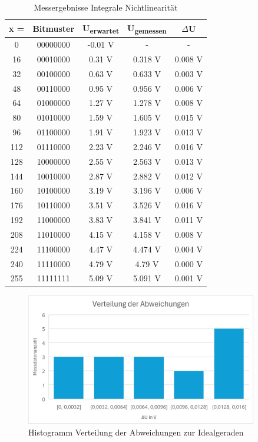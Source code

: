 \documentclass[a4paper,12pt]{article}
\begin{document}
\begin{table}[H]
    \centering
    \begin{tabular}{|c|c|c|c|c|}
        \hline
        x = & Bitmuster & U\textsubscript{erwartet} & U\textsubscript{gemessen} & $\Delta$U \\
        \hline
        0 & 00000000 & -0.01 V & - & - \\
        16 & 00010000 & 0.31 V & 0.318 V & 0.008 V \\
        32 & 00100000 & 0.63 V & 0.633 V & 0.003 V \\
        48 & 00110000 & 0.95 V & 0.956 V & 0.006 V \\
        64 & 01000000 & 1.27 V & 1.278 V & 0.008 V \\
        80 & 01010000 & 1.59 V & 1.605 V & 0.015 V \\
        96 & 01100000 & 1.91 V & 1.923 V & 0.013 V \\
        112 & 01110000 & 2.23 V & 2.246 V & 0.016 V \\
        128 & 10000000 & 2.55 V & 2.563 V & 0.013 V \\
        144 & 10010000 & 2.87 V & 2.882 V & 0.012 V \\
        160 & 10100000 & 3.19 V & 3.196 V & 0.006 V \\
        176 & 10110000 & 3.51 V & 3.526 V & 0.016 V \\
        192 & 11000000 & 3.83 V & 3.841 V & 0.011 V \\
        208 & 11010000 & 4.15 V & 4.158 V & 0.008 V \\
        224 & 11100000 & 4.47 V & 4.474 V & 0.004 V \\
        240 & 11110000 & 4.79 V & 4.79 V & 0.000 V \\
        255 & 11111111 & 5.09 V & 5.091 V & 0.001 V \\
        \hline
    \end{tabular}
    \caption{Messergebnisse Integrale Nichtlinearität}
\end{table}


\begin{figure}[H]
    \centering
    \includegraphics[width=0.9\textwidth]{../Quellen/Labor1/Versuch1/HistogrammAbweichungs-Verteilung.png}
    \caption{Histogramm Verteilung der Abweichungen zur Idealgeraden}
\end{figure}
\end{document}
